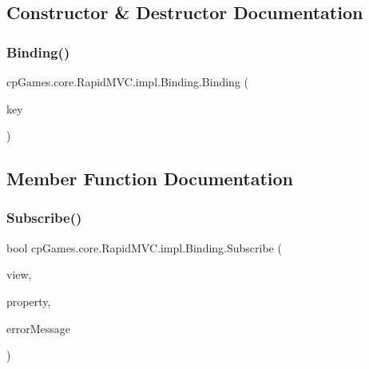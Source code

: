 \subsection{Constructor \& Destructor Documentation}
\mbox{\label{classcp_games_1_1core_1_1_rapid_m_v_c_1_1impl_1_1_binding_aa53ebf2d17f246c0af5c6e4e4383ba54}} 
\subsubsection{\texorpdfstring{Binding()}{Binding()}}
{\footnotesize\ttfamily cp\+Games.\+core.\+Rapid\+M\+V\+C.\+impl.\+Binding.\+Binding (\begin{DoxyParamCaption}\item[{\mbox{\hyperlink{interfacecp_games_1_1core_1_1_rapid_m_v_c_1_1_i_binding_key}{I\+Binding\+Key}}}]{key }\end{DoxyParamCaption})}



\subsection{Member Function Documentation}
\mbox{\label{classcp_games_1_1core_1_1_rapid_m_v_c_1_1impl_1_1_binding_a151e86bcc928830e09f9f55197b88487}} 
\subsubsection{\texorpdfstring{Subscribe()}{Subscribe()}}
{\footnotesize\ttfamily bool cp\+Games.\+core.\+Rapid\+M\+V\+C.\+impl.\+Binding.\+Subscribe (\begin{DoxyParamCaption}\item[{\mbox{\hyperlink{interfacecp_games_1_1core_1_1_rapid_m_v_c_1_1_i_view}{I\+View}}}]{view,  }\item[{Property\+Info}]{property,  }\item[{out string}]{error\+Message }\end{DoxyParamCaption})}



